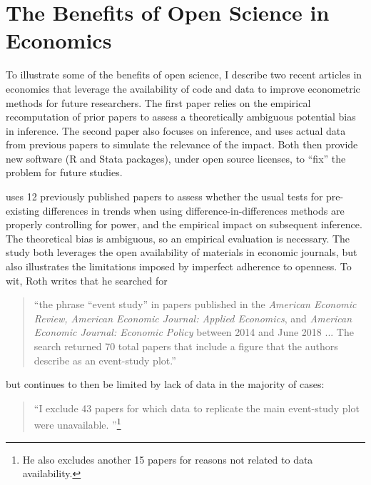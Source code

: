 \documentclass{article}
\begin{document}
%

\section{The Benefits of Open Science in Economics}
\label{sec:benefits}

To illustrate some of the benefits of open science, I describe two recent articles in economics that leverage the availability of code and data to improve econometric methods for future researchers. The first paper relies on the empirical recomputation of prior papers to assess a theoretically ambiguous potential bias in inference. The second paper also focuses on inference, and uses actual data from previous papers to simulate the relevance of the impact. Both then provide new software (R and Stata packages), under open source licenses, to ``fix'' the problem for future studies. 

\citet{roth_pretest_2022}  uses 12 previously published papers to assess whether the usual tests for pre-existing differences in trends when using difference-in-differences methods are properly controlling for power, and the empirical impact on subsequent inference. The theoretical bias is ambiguous, so an empirical evaluation is necessary. The study both leverages the open availability of materials in economic journals, but also illustrates the limitations imposed by imperfect adherence to openness. To wit, Roth writes that he searched for 

\begin{quote}
``the phrase “event study” in papers published in the \textit{American Economic Review, American Economic Journal: Applied Economics}, and \textit{American Economic Journal: Economic Policy} between
2014 and June 2018 ... The search returned 70 total papers that include a figure that the authors describe as an event-study plot.''
\end{quote}

but continues to then be limited by lack of data in the majority of cases:

\begin{quote}
    ``I exclude 43 papers for which data to replicate the main event-study plot were unavailable. \citep[pg. 307]{roth_pretest_2022}''\footnote{He also excludes another 15 papers for reasons not related to data availability.}
\end{quote}
\end{document}
